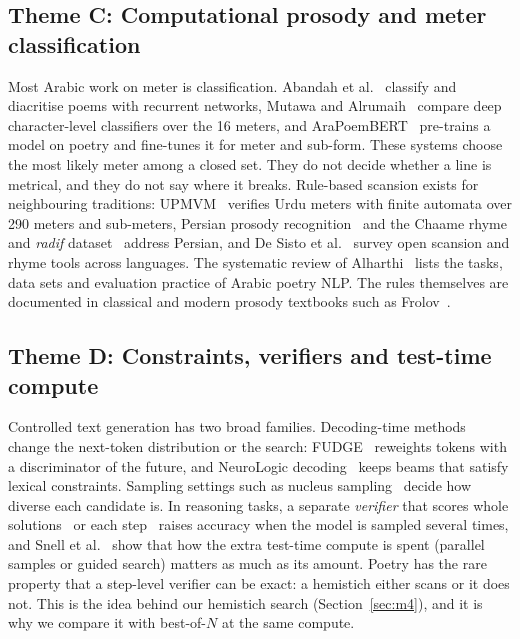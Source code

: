 \subsection{Theme C: Computational prosody and meter classification}
Most Arabic work on meter is classification. Abandah et al.~\cite{abandah2022classifying} classify and diacritise
poems with recurrent networks, Mutawa and Alrumaih~\cite{mutawa2025arabicmeter} compare deep character-level
classifiers over the 16 meters, and AraPoemBERT~\cite{qarah2024arapoembert} pre-trains a model on poetry and fine-tunes
it for meter and sub-form. These systems choose the most likely meter among a closed set. They do not decide whether a
line is metrical, and they do not say where it breaks. Rule-based scansion exists for neighbouring traditions:
UPMVM~\cite{zaman2025upmvm} verifies Urdu meters with finite automata over 290 meters and sub-meters, Persian prosody
recognition~\cite{shahrestani2025persianprosody} and the Chaame rhyme and \emph{radif}
dataset~\cite{rezaei2026chaame} address Persian, and De Sisto et al.~\cite{desisto2024poetrytools} survey open
scansion and rhyme tools across languages. The systematic review of Alharthi~\cite{alharthi2026arabicpoetryslr} lists
the tasks, data sets and evaluation practice of Arabic poetry NLP. The rules themselves are documented in classical
and modern prosody textbooks such as Frolov~\cite{frolov2000classical}.

\subsection{Theme D: Constraints, verifiers and test-time compute}
Controlled text generation has two broad families. Decoding-time methods change the next-token distribution or the
search: FUDGE~\cite{yang2021fudge} reweights tokens with a discriminator of the future, and NeuroLogic
decoding~\cite{lu2021neurologic} keeps beams that satisfy lexical constraints. Sampling settings such as nucleus
sampling~\cite{holtzman2020curious} decide how diverse each candidate is. In reasoning tasks, a separate
\emph{verifier} that scores whole solutions~\cite{cobbe2021verifiers} or each step~\cite{lightman2024verify} raises
accuracy when the model is sampled several times, and Snell et al.~\cite{snell2025scaling} show that how the extra
test-time compute is spent (parallel samples or guided search) matters as much as its amount. Poetry has the rare
property that a step-level verifier can be exact: a hemistich either scans or it does not. This is the idea behind our
hemistich search (Section~\ref{sec:m4}), and it is why we compare it with best-of-$N$ at the same compute.

